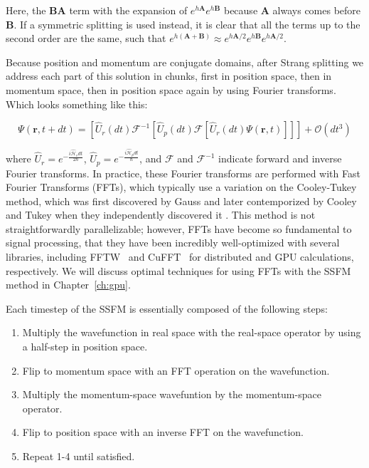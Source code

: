 \noindent Here, the $\mathbf{BA}$ term with the expansion of $e^{h\mathbf{A}}e^{h\mathbf{B}}$ because $\mathbf{A}$ always comes before $\mathbf{B}$.
If a symmetric splitting is used instead, it is clear that all the terms up to the second order are the same, such that $e^{h(\mathbf{A}+\mathbf{B})} \approx e^{h\mathbf{A}/2}e^{h\mathbf{B}}e^{h\mathbf{A}/2}$.

Because position and momentum are conjugate domains, after Strang splitting we address each part of this solution in chunks, first in position space, then in momentum space, then in position space again by using Fourier transforms.
Which looks something like this:

\begin{equation}
\Psi(\mathbf{r}, t+dt) = \left[\hat{U}_r(dt)\mathcal{F}^{-1}\left[\hat{U}_p(dt) \mathcal{F} \left[\hat{U}_r(dt) \Psi(\mathbf{r},t) \right] \right] \right] + \mathcal{O}(dt^3)
\end{equation}

\noindent where $\hat{U}_r = e^{-\frac{i\mathcal{\hat{H}}_vdt}{2\hbar}}$, $\hat{U}_p = e^{-\frac{i\mathcal{\hat{H}}_pdt}{\hbar}}$, and $\mathcal{F}$ and $\mathcal{F}^{-1}$ indicate forward and inverse Fourier transforms.
In practice, these Fourier transforms are performed with Fast Fourier Transforms (FFTs), which typically use a variation on the Cooley-Tukey method, which was first discovered by Gauss and later contemporized by Cooley and Tukey when they independently discovered it \cite{cooley1965}.
This method is not straightforwardly parallelizable; however, FFTs have become so fundamental to signal processing, that they have been incredibly well-optimized with several libraries, including FFTW~\cite{frigo1998} and CuFFT~\cite{fatica2008} for distributed and GPU calculations, respectively.
We will discuss optimal techniques for using FFTs with the SSFM method in Chapter~\ref{ch:gpu}.

Each timestep of the SSFM is essentially composed of the following steps:

\begin{enumerate}
\item Multiply the wavefunction in real space with the real-space operator by using a half-step in position space.
\item Flip to momentum space with an FFT operation on the wavefunction.
\item Multiply the momentum-space wavefuntion by the momentum-space operator.
\item Flip to position space with an inverse FFT on the wavefunction.
\item Repeat 1-4 until satisfied.
\end{enumerate}

